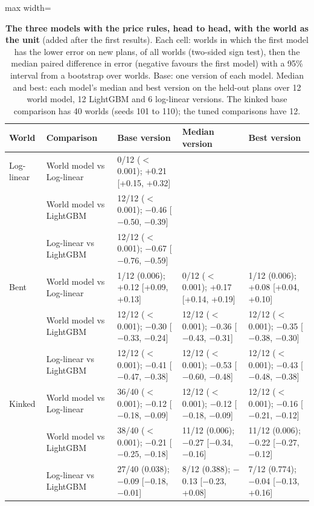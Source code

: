 \begin{table}[t]
\centering
\caption{\textbf{The three models with the price rules, head to head, with the world as the unit} (added after the
first results). Each cell: worlds in which the first model has the lower error on new plans, of all worlds (two-sided
sign test), then the median paired difference in error (negative favours the first model) with a 95\% interval from
a bootstrap over worlds. Base: one version of each model. Median and best: each model's median and best version on
the held-out plans over 12 world model, 12 LightGBM and 6 log-linear versions. The kinked base comparison has 40
worlds (seeds 101 to 110); the tuned comparisons have 12.}
\label{tab:h2h}
\footnotesize\setlength{\tabcolsep}{3.5pt}
\begin{adjustbox}{max width=\textwidth}
\begin{tabular}{lllll}
\toprule
World & Comparison & Base version & Median version & Best version \\
\midrule
Log-linear & World model vs Log-linear & 0/12 ($<$0.001); +0.21 [+0.15, +0.32] &  &  \\
 & World model vs LightGBM & 12/12 ($<$0.001); $-$0.46 [$-$0.50, $-$0.39] &  &  \\
 & Log-linear vs LightGBM & 12/12 ($<$0.001); $-$0.67 [$-$0.76, $-$0.59] &  &  \\
Bent & World model vs Log-linear & 1/12 (0.006); +0.12 [+0.09, +0.13] & 0/12 ($<$0.001); +0.17 [+0.14, +0.19] & 1/12 (0.006); +0.08 [+0.04, +0.10] \\
 & World model vs LightGBM & 12/12 ($<$0.001); $-$0.30 [$-$0.33, $-$0.24] & 12/12 ($<$0.001); $-$0.36 [$-$0.43, $-$0.31] & 12/12 ($<$0.001); $-$0.35 [$-$0.38, $-$0.30] \\
 & Log-linear vs LightGBM & 12/12 ($<$0.001); $-$0.41 [$-$0.47, $-$0.38] & 12/12 ($<$0.001); $-$0.53 [$-$0.60, $-$0.48] & 12/12 ($<$0.001); $-$0.43 [$-$0.48, $-$0.38] \\
Kinked & World model vs Log-linear & 36/40 ($<$0.001); $-$0.12 [$-$0.18, $-$0.09] & 12/12 ($<$0.001); $-$0.12 [$-$0.18, $-$0.09] & 12/12 ($<$0.001); $-$0.16 [$-$0.21, $-$0.12] \\
 & World model vs LightGBM & 38/40 ($<$0.001); $-$0.21 [$-$0.25, $-$0.18] & 11/12 (0.006); $-$0.27 [$-$0.34, $-$0.16] & 11/12 (0.006); $-$0.22 [$-$0.27, $-$0.12] \\
 & Log-linear vs LightGBM & 27/40 (0.038); $-$0.09 [$-$0.18, $-$0.01] & 8/12 (0.388); $-$0.13 [$-$0.23, +0.08] & 7/12 (0.774); $-$0.04 [$-$0.13, +0.16] \\
\bottomrule
\end{tabular}
\end{adjustbox}
\end{table}

